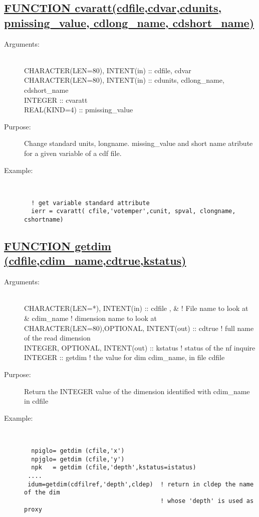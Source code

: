 \documentclass[a4paper,11pt]{article}
\begin{document}
\subsection*{\underline{FUNCTION cvaratt(cdfile,cdvar,cdunits, pmissing\_value, cdlong\_name, cdshort\_name)  }}
\begin{description}
\item[Arguments:] \ \\
    CHARACTER(LEN=80), INTENT(in) :: cdfile, cdvar \\
    CHARACTER(LEN=80), INTENT(in) :: cdunits, cdlong\_name, cdshort\_name \\
    INTEGER :: cvaratt \\
    REAL(KIND=4) :: pmissing\_value
\item[Purpose:] Change standard units, longname. missing\_value and short name atribute for a given variable of a cdf file.
\item[Example:] \ \\
\begin{verbatim}
  ! get variable standard attribute
  ierr = cvaratt( cfile,'votemper',cunit, spval, clongname, cshortname)
\end{verbatim}
\end{description}
  
  
\newpage
\subsection*{\underline{FUNCTION getdim (cdfile,cdim\_name,cdtrue,kstatus)  }}
\begin{description}
\item[Arguments:] \ \\
    CHARACTER(LEN=*), INTENT(in) :: cdfile , \&  ! File name to look at \\
         \&                           cdim\_name   ! dimension name to look at \\
    CHARACTER(LEN=80),OPTIONAL, INTENT(out) ::  cdtrue ! full name of the read dimension \\
    INTEGER, OPTIONAL, INTENT(out) :: kstatus   ! status of the nf inquire \\
    INTEGER :: getdim                           ! the value for dim cdim\_name, in file cdfile 
\item[Purpose:]  Return the INTEGER value of the dimension identified with cdim\_name in cdfile
\item[Example:]\ \\
\begin{verbatim}
  npiglo= getdim (cfile,'x')
  npjglo= getdim (cfile,'y')
  npk   = getdim (cfile,'depth',kstatus=istatus)
 ....
 idum=getdim(cdfilref,'depth',cldep)  ! return in cldep the name of the dim 
                                      ! whose 'depth' is used as proxy
\end{verbatim}
\end{description}
\newpage
\end{document}
